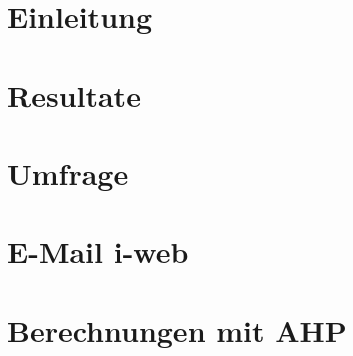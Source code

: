 \documentclass[12pt, a4paper, twoside]{report}
\title{}
\author{}
\date{\today}
\begin{document}
\sloppy



 
\renewcommand{\contentsname}{Inhaltsverzeichnis}
\renewcommand{\listfigurename}{Abbildungsverzeichnis}

\renewcommand{\listtablename}{Tabellenverzeichnis}

\renewcommand{\figurename}{Abbildung}
\renewcommand{\tablename}{Tabelle}
\tableofcontents

\glsaddall


\printglossary[title=Glossar, toctitle=Glossar,nonumberlist]



\chapter{Einleitung}


\chapter{Resultate}



\printbibliography[title={Literaturverzeichnis}, heading=bibintoc]

\listoffigures

\listoftables

\appendix
\chapter{Umfrage}

\chapter{E-Mail i-web}

\chapter{Berechnungen mit AHP}

\end{document}
